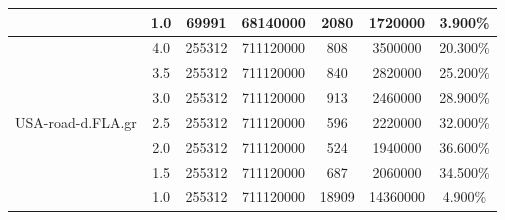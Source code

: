 \begin{table}[H]
\begin{adjustbox}{max width=\textwidth}
\begin{tabular}{|c|c|c|c|c|c|c|}
                                   & 1.0                                     & 69991                                & 68140000                                     & 2080                                   & 1720000                                        & 3.900\%                                                        \\ \hline
\multirow{7}{*}{USA-road-d.FLA.gr} & 4.0                                     & 255312                               & 711120000                                    & 808                                    & 3500000                                        & 20.300\%                                                       \\ \cline{2-7} 
                                   & 3.5                                     & 255312                               & 711120000                                    & 840                                    & 2820000                                        & 25.200\%                                                       \\ \cline{2-7} 
                                   & 3.0                                     & 255312                               & 711120000                                    & 913                                    & 2460000                                        & 28.900\%                                                       \\ \cline{2-7} 
                                   & 2.5                                     & 255312                               & 711120000                                    & 596                                    & 2220000                                        & 32.000\%                                                       \\ \cline{2-7} 
                                   & 2.0                                     & 255312                               & 711120000                                    & 524                                    & 1940000                                        & 36.600\%                                                       \\ \cline{2-7} 
                                   & 1.5                                     & 255312                               & 711120000                                    & 687                                    & 2060000                                        & 34.500\%                                                       \\ \cline{2-7} 
                                   & 1.0                                     & 255312                               & 711120000                                    & 18909                                  & 14360000                                       & 4.900\%                                                        \\ \hline
\end{tabular}
\end{adjustbox}
\end{table}

